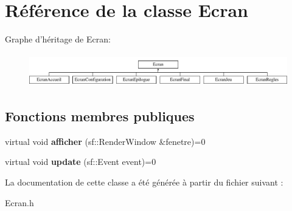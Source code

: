 \hypertarget{classEcran}{\section{\-Référence de la classe \-Ecran}
\label{classEcran}
}
\-Graphe d'héritage de \-Ecran\-:\begin{figure}[H]
\begin{center}
\leavevmode
\includegraphics[height=1.435897cm]{classEcran}
\end{center}
\end{figure}
\subsection*{\-Fonctions membres publiques}
\begin{DoxyCompactItemize}
\item 
\hypertarget{classEcran_a2b1ad69e95ff2b6fb1a411b3645922e0}{virtual void {\bfseries afficher} (sf\-::\-Render\-Window \&fenetre)=0}\label{classEcran_a2b1ad69e95ff2b6fb1a411b3645922e0}

\item 
\hypertarget{classEcran_a03b54d987a5f17eab6463a3b84ef0ba4}{virtual void {\bfseries update} (sf\-::\-Event event)=0}\label{classEcran_a03b54d987a5f17eab6463a3b84ef0ba4}

\end{DoxyCompactItemize}


\-La documentation de cette classe a été générée à partir du fichier suivant \-:\begin{DoxyCompactItemize}
\item 
\-Ecran.\-h\end{DoxyCompactItemize}

